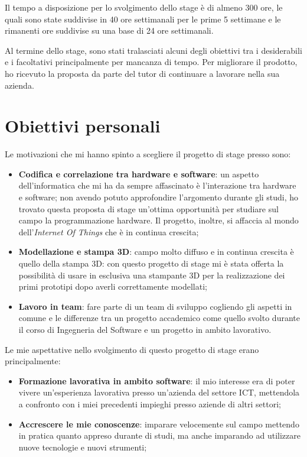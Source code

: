Il tempo a disposizione per lo svolgimento dello stage è di almeno 300 ore, le quali sono state suddivise in 40 ore settimanali per le prime 5 settimane e le rimanenti ore suddivise su una base di 24 ore settimanali.

Al termine dello stage, sono stati tralasciati alcuni degli obiettivi tra i desiderabili e i facoltativi principalmente per mancanza di tempo.
Per migliorare il prodotto, ho ricevuto la proposta da parte del tutor di continuare a lavorare nella sua azienda.

\section{Obiettivi personali}
Le motivazioni che mi hanno spinto a scegliere il progetto di stage presso \lab{} sono:

\begin{itemize}
\item \textbf{Codifica e correlazione tra hardware e software}: un aspetto dell'informatica che mi ha da sempre affascinato è l'interazione tra hardware e software; non avendo potuto approfondire l'argomento durante gli studi, ho trovato questa proposta di stage un'ottima opportunità per studiare sul campo la programmazione hardware. Il progetto, inoltre, si affaccia al mondo dell'\textit{Internet Of Things} che è in continua crescita;
\item \textbf{Modellazione e stampa 3D}: campo molto diffuso e in continua crescita è quello della stampa 3D: con questo progetto di stage mi è stata offerta la possibilità di usare in esclusiva una stampante 3D per la realizzazione dei primi prototipi dopo averli correttamente modellati;
\item \textbf{Lavoro in team}: fare parte di un team di sviluppo cogliendo gli aspetti in comune e le differenze tra un progetto accademico come quello svolto durante il corso di Ingegneria del Software e un progetto in ambito lavorativo. 
\end{itemize}

Le mie aspettative nello svolgimento di questo progetto di stage erano principalmente:
\begin{itemize}
\item \textbf{Formazione lavorativa in ambito software}: il mio interesse era di poter vivere un'esperienza lavorativa presso un'azienda del settore ICT, mettendola a confronto con i miei precedenti impieghi presso aziende di altri settori;
\item \textbf{Accrescere le mie conoscenze}: imparare velocemente sul campo mettendo in pratica quanto appreso durante di studi, ma anche imparando ad utilizzare nuove tecnologie e nuovi strumenti;
\end{itemize}


